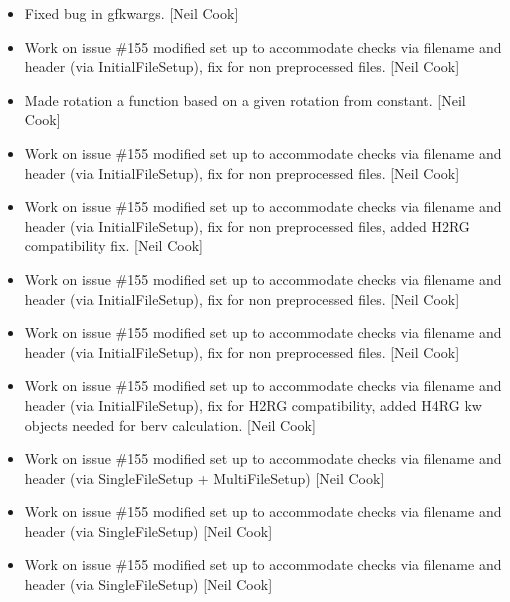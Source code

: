 \documentclass[a4paper,10pt,english]{report}
\begin{document}
\begin{itemize}
\item {} 
Fixed bug in gfkwargs. {[}Neil Cook{]}

\item {} 
Work on issue \#155 \sphinxhyphen{} modified set up to accommodate checks via
filename and header (via InitialFileSetup), fix for non pre\sphinxhyphen{}processed
files. {[}Neil Cook{]}

\item {} 
Made rotation a function based on a given rotation from constant.
{[}Neil Cook{]}

\item {} 
Work on issue \#155 \sphinxhyphen{} modified set up to accommodate checks via
filename and header (via InitialFileSetup), fix for non pre\sphinxhyphen{}processed
files. {[}Neil Cook{]}

\item {} 
Work on issue \#155 \sphinxhyphen{} modified set up to accommodate checks via
filename and header (via InitialFileSetup), fix for non pre\sphinxhyphen{}processed
files, added H2RG compatibility fix. {[}Neil Cook{]}

\item {} 
Work on issue \#155 \sphinxhyphen{} modified set up to accommodate checks via
filename and header (via InitialFileSetup), fix for non pre\sphinxhyphen{}processed
files. {[}Neil Cook{]}

\item {} 
Work on issue \#155 \sphinxhyphen{} modified set up to accommodate checks via
filename and header (via InitialFileSetup), fix for non pre\sphinxhyphen{}processed
files. {[}Neil Cook{]}

\item {} 
Work on issue \#155 \sphinxhyphen{} modified set up to accommodate checks via
filename and header (via InitialFileSetup), fix for H2RG
compatibility, added H4RG kw objects needed for berv calculation.
{[}Neil Cook{]}

\item {} 
Work on issue \#155 \sphinxhyphen{} modified set up to accommodate checks via
filename and header (via SingleFileSetup + MultiFileSetup) {[}Neil Cook{]}

\item {} 
Work on issue \#155 \sphinxhyphen{} modified set up to accommodate checks via
filename and header (via SingleFileSetup) {[}Neil Cook{]}

\item {} 
Work on issue \#155 \sphinxhyphen{} modified set up to accommodate checks via
filename and header (via SingleFileSetup) {[}Neil Cook{]}


\end{itemize}
\end{document}
